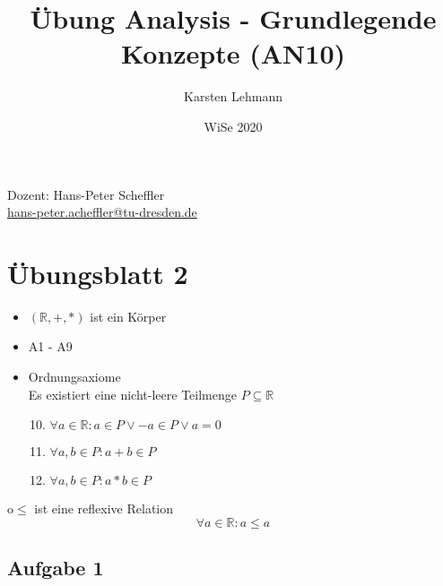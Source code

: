 \documentclass{article}
\author{Karsten Lehmann}
\date{WiSe 2020}
\title{Übung Analysis - Grundlegende Konzepte (AN10)}
\begin{document}
\maketitle

\vfill
\begin{center}
  Dozent: Hans-Peter Scheffler \\
  \href{mailto:hans-peter.scheffler@tu-dresden.de}{hans-peter.acheffler@tu-dresden.de}
\end{center}

\newpage

\section*{Übungsblatt 2}

\begin{itemize}
\item $(\mathbb{R}, +, *)$ ist ein Körper
\item A1 - A9
\item Ordnungsaxiome \\
  Es existiert eine nicht-leere Teilmenge $P \subseteq \mathbb{R}$
  \begin{enumerate}[label=(A\arabic*)]
    \setcounter{enumi}{9}
  \item $\forall a \in \mathbb{R} \colon a \in P \lor -a \in P \lor a = 0$
  \item $\forall a,b \in P \colon a + b \in P$
  \item $\forall a,b \in P \colon a * b \in P$
  \end{enumerate}
\end{itemize}


o$\leq$ ist eine reflexive Relation
\[
  \forall a \in \mathbb{R} \colon a \leq a
\]

\subsection*{Aufgabe 1}
\end{document}
